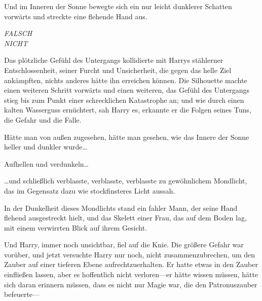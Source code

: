 Und im Inneren der Sonne bewegte sich ein nur leicht dunklerer Schatten vorwärts und streckte eine flehende Hand aus.

\emph{FALSCH\\
NICHT}

Das plötzliche Gefühl des Untergangs kollidierte mit Harrys stählerner Entschlossenheit, seiner Furcht und Unsicherheit, die gegen das helle Ziel ankämpften, nichts anderes hätte ihn erreichen können. Die Silhouette machte einen weiteren Schritt vorwärts und einen weiteren, das Gefühl des Untergangs stieg bis zum Punkt einer schrecklichen Katastrophe an; und wie durch einen kalten Wasserguss ernüchtert, sah Harry es, erkannte er die Folgen seines Tuns, die Gefahr und die Falle.

Hätte man von außen zugesehen, hätte man gesehen, wie das Innere der Sonne heller und dunkler wurde…

Aufhellen und verdunkeln…

…und schließlich verblasste, verblasste, verblasste zu gewöhnlichem Mondlicht, das im Gegensatz dazu wie stockfinsteres Licht aussah.

In der Dunkelheit dieses Mondlichts stand ein fahler Mann, der seine Hand flehend ausgestreckt hielt, und das Skelett einer Frau, das auf dem Boden lag, mit einem verwirrten Blick auf ihrem Gesicht.

Und Harry, immer noch unsichtbar, fiel auf die Knie. Die größere Gefahr war vorüber, und jetzt versuchte Harry nur noch, nicht zusammenzubrechen, um den Zauber auf einer tieferen Ebene aufrechtzuerhalten. Er hatte etwas in den Zauber einfließen lassen, aber es hoffentlich nicht verloren—er hätte wissen müssen, hätte sich daran erinnern müssen, dass es nicht nur Magie war, die den Patronuszauber befeuerte—

